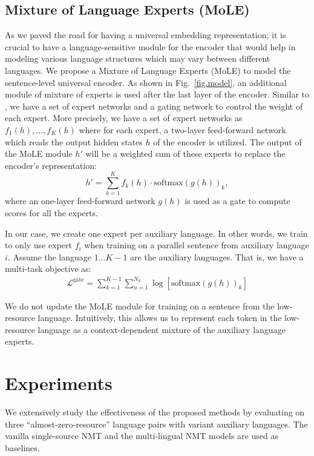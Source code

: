 \subsection{Mixture of Language Experts (MoLE)}
\label{sec.moe}
As we paved the road for having a universal embedding representation; it is crucial to have a  language-sensitive module for the encoder that would help in modeling various  language structures which may  vary between different languages. 
We propose a Mixture of Language Experts (MoLE) to model the sentence-level universal encoder. As shown in Fig.~\ref{fig.model}, 
an additional module of mixture of experts is used after the last layer of the encoder. Similar to \cite{shazeer2017outrageously}, we have a set of expert networks and a gating network  to control the weight of each expert. More precisely, we have a set of expert networks as $f_1(h), ..., f_{K}(h)$ where for each expert, a two-layer feed-forward network which reads the output hidden states $h$ of the encoder is utilized. The output of the MoLE module $h'$ will be a weighted sum of these experts to replace the encoder's representation:
\begin{equation}
h'=\sum_{k=1}^K f_k(h)\cdot \text{softmax}(g(h))_k,
\end{equation}
where an one-layer feed-forward network $g(h)$ is used as a gate to compute scores for all the experts.

In our case, we create one expert per auxiliary language. In other words, we train to only use expert $f_i$ when training on a parallel sentence from auxiliary language $i$. Assume the language $1 ... K-1$ are the auxiliary languages. That is, we have a multi-task objective as:
\begin{equation}
\begin{split}
\mathcal{L}^{\text{gate}} = \sum_{k=1}^{K-1}\sum_{n=1}^{N_k}\log \left[\text{softmax}\left(g(h)\right)_{k}\right]
\end{split}
\end{equation}

We do not update the MoLE module for training on a sentence from the low-resource language. Intuitively, this allows us to represent each token in the low-resource language as a context-dependent mixture of the auxiliary language experts.



\section{Experiments}
\label{sec.exps}
We extensively study the effectiveness of the proposed methods by evaluating on three ``almost-zero-resource'' language pairs with variant auxiliary languages. The vanilla single-source NMT and the multi-lingual NMT models are used as baselines.

